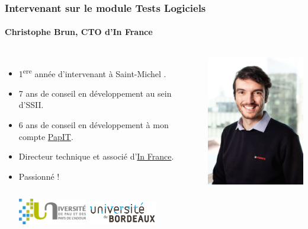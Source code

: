 \documentclass{beamer}
\begin{document}
    \begin{frame}
        \transdissolve
        \frametitle{Intervenant sur le module Tests Logiciels}
        \framesubtitle{Christophe Brun, CTO d'In France}

        \begin{columns}
            \begin{itemize}
                \item 1\textsuperscript{ere} année d’intervenant à Saint-Michel .

                \item 7 ans de conseil en développement au sein d’SSII.

                \item 6 ans de conseil en développement à mon compte \href{https://papit.fr}{PapIT}.

                \item Directeur technique et associé d’\href{https://in-france.fr}{In France}.

                \item Passionné !
                \bigbreak
                \begin{columns}
                    \centering
                    \includegraphics[width=3cm]{image/logo-uppa.png}
                    \centering
                    \includegraphics[width=3cm]{image/logo-universite-bordeaux.png}
                \end{columns}
            \end{itemize}
            \centering
            \includegraphics[width=5cm]{image/trombine-christophe.jpg}
        \end{columns}
    \end{frame}
\end{document}
